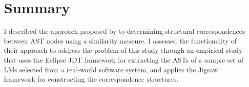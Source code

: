 \section{Summary}  \label{summary}
I described the approach proposed by \citet{2008:fse:cottrell} to determining structural correspondences between AST nodes using a similarity measure. I assessed the functionality of their approach to address the problem of this study through an empirical study that uses the Eclipse JDT framework for extracting the ASTs of a sample set of LMs selected from a real-world software system, and applies the Jigsaw framework for constructing the correspondence structures.





